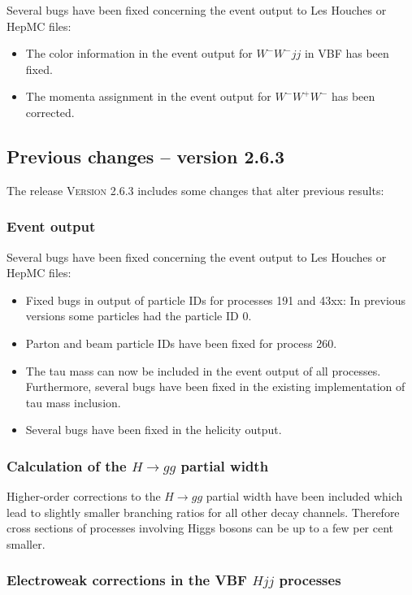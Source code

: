 \documentclass[english,12pt]{article}
\begin{document}
Several bugs have been fixed concerning the event output to Les Houches or HepMC files:
\begin{itemize}
 \item The color information in the event output for $W^-W^- jj$ in VBF has been fixed.
 \item The momenta assignment in the event output for $W^-W^+W^-$ has been corrected.
\end{itemize}


\subsection{Previous changes -- version 2.6.3}


The release \textsc{Version 2.6.3} includes some changes that alter previous results:

\subsubsection{Event output}

Several bugs have been fixed concerning the event output to Les Houches or HepMC files:
\begin{itemize}
 \item Fixed bugs in output of particle IDs for processes 191 and 43xx: In previous versions
       some particles had the particle ID 0.
 \item Parton and beam particle IDs have been fixed for process 260.
 \item The tau mass can now be included in the event output of all processes. Furthermore,
       several bugs have been fixed in the existing implementation of tau mass inclusion.
 \item Several bugs have been fixed in the helicity output.
\end{itemize}

\subsubsection{Calculation of the $H\to gg$ partial width}

Higher-order corrections to the $H\to gg$ partial width have been included which lead to slightly smaller
branching ratios for all other decay channels. Therefore cross sections of processes involving Higgs bosons
can be up to a few per cent smaller.

\subsubsection{Electroweak corrections in the VBF $Hjj$ processes}
\end{document}
